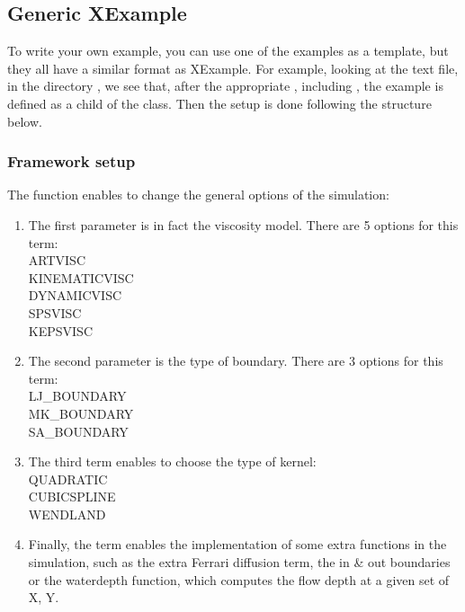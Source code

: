 \subsection{Generic XExample}

To write your own example, you can use one of the examples as a template, 
but they all have a similar format as XExample.  
For example, looking at the text file,  in the directory 
, we see that, after the appropriate , 
including , the example is defined as a 
child of the  class.  
Then the setup is done following the structure below.


\subsubsection{Framework setup}

The  function enables to change the
 general options of the simulation:
\begin{enumerate}
\item The first parameter is in fact the viscosity model. There are 5 options for this term: \\
ARTVISC\\
KINEMATICVISC\\
DYNAMICVISC\\
SPSVISC\\
KEPSVISC\\
\item The second parameter is the type of boundary. There are 3 options for this term:\\
LJ\_BOUNDARY\\
MK\_BOUNDARY\\
SA\_BOUNDARY\\
\item The third term enables to choose the type of kernel:\\
QUADRATIC\\
CUBICSPLINE\\
WENDLAND\\
\item Finally, the  term enables the implementation 
of some extra functions in the simulation, such as the extra Ferrari diffusion term, 
the in \& out boundaries or the waterdepth function, 
which computes the flow depth at a given set of X, Y.
\end{enumerate}

